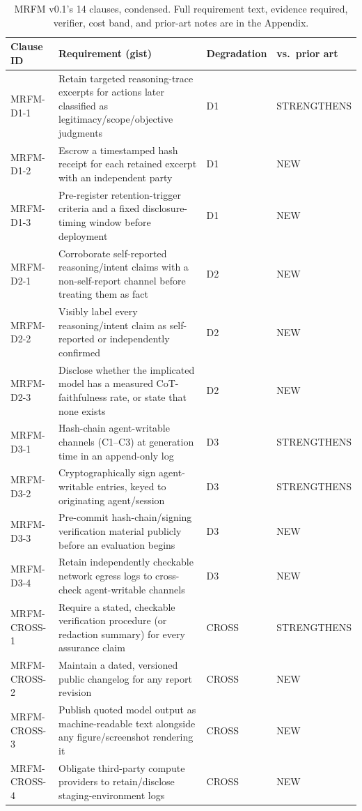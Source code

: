 \documentclass[10pt]{article}
\begin{document}
\begin{table}[htbp]
\centering
\footnotesize
\begin{tabular}{@{}p{2.1cm}p{7.4cm}p{1.6cm}p{1.9cm}@{}}
\toprule
\textbf{Clause ID} & \textbf{Requirement (gist)} & \textbf{Degradation} & \textbf{vs.\ prior art} \\
\midrule
MRFM-D1-1 & Retain targeted reasoning-trace excerpts for actions later classified as legitimacy/scope/objective judgments & D1 & STRENGTHENS \\
MRFM-D1-2 & Escrow a timestamped hash receipt for each retained excerpt with an independent party & D1 & NEW \\
MRFM-D1-3 & Pre-register retention-trigger criteria and a fixed disclosure-timing window before deployment & D1 & NEW \\
MRFM-D2-1 & Corroborate self-reported reasoning/intent claims with a non-self-report channel before treating them as fact & D2 & NEW \\
MRFM-D2-2 & Visibly label every reasoning/intent claim as self-reported or independently confirmed & D2 & NEW \\
MRFM-D2-3 & Disclose whether the implicated model has a measured CoT-faithfulness rate, or state that none exists & D2 & NEW \\
MRFM-D3-1 & Hash-chain agent-writable channels (C1--C3) at generation time in an append-only log & D3 & STRENGTHENS \\
MRFM-D3-2 & Cryptographically sign agent-writable entries, keyed to originating agent/session & D3 & STRENGTHENS \\
MRFM-D3-3 & Pre-commit hash-chain/signing verification material publicly before an evaluation begins & D3 & NEW \\
MRFM-D3-4 & Retain independently checkable network egress logs to cross-check agent-writable channels & D3 & NEW \\
MRFM-CROSS-1 & Require a stated, checkable verification procedure (or redaction summary) for every assurance claim & CROSS & STRENGTHENS \\
MRFM-CROSS-2 & Maintain a dated, versioned public changelog for any report revision & CROSS & NEW \\
MRFM-CROSS-3 & Publish quoted model output as machine-readable text alongside any figure/screenshot rendering it & CROSS & NEW \\
MRFM-CROSS-4 & Obligate third-party compute providers to retain/disclose staging-environment logs & CROSS & NEW \\
\bottomrule
\end{tabular}
\caption{MRFM v0.1's 14 clauses, condensed. Full requirement text, evidence
required, verifier, cost band, and prior-art notes are in the Appendix.}
\label{tab:mrfm-summary}
\end{table}
\end{document}
